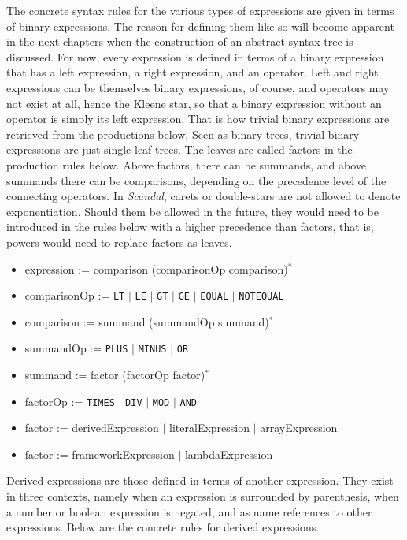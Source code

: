 The concrete syntax rules for the various types of expressions are given in terms of binary expressions. The reason for defining them like so will become apparent in the next chapters when the construction of an abstract syntax tree is discussed. For now, every expression is defined in terms of a binary expression that has a left expression, a right expression, and an operator. Left and right expressions can be themselves binary expressions, of course, and operators may not exist at all, hence the Kleene star, so that a binary expression without an operator is simply its left expression. That is how trivial binary expressions are retrieved from the productions below. Seen as binary trees, trivial binary expressions are just single-leaf trees. The leaves are called factors in the production rules below. Above factors, there can be summands, and above summands there can be comparisons, depending on the precedence level of the connecting operators. In \emph{Scandal}, carets or double-stars are not allowed to denote exponentiation. Should them be allowed in the future, they would need to be introduced in the rules below with a higher precedence than factors, that is, powers would need to replace factors as leaves.

\begin{itemize}
	\item expression := comparison (comparisonOp comparison)$^*$
	\item comparisonOp := \texttt{LT} $|$ \texttt{LE} $|$ \texttt{GT} $|$ \texttt{GE} $|$ \texttt{EQUAL} $|$ \texttt{NOTEQUAL}
	\item comparison := summand (summandOp summand)$^*$
	\item summandOp := \texttt{PLUS} $|$ \texttt{MINUS} $|$ \texttt{OR}
	\item summand := factor (factorOp factor)$^*$
	\item factorOp := \texttt{TIMES} $|$ \texttt{DIV} $|$ \texttt{MOD} $|$ \texttt{AND}
	\item factor := derivedExpression $|$ literalExpression $|$ arrayExpression
	\item factor := frameworkExpression $|$ lambdaExpression
\end{itemize}

Derived expressions are those defined in terms of another expression. They exist in three contexts, namely when an expression is surrounded by parenthesis, when a number or boolean expression is negated, and as name references to other expressions. Below are the concrete rules for derived expressions.

